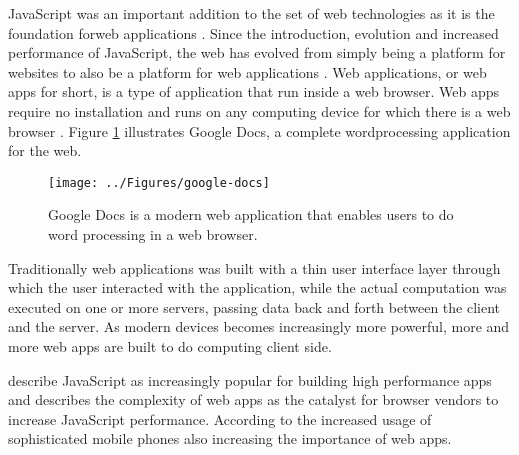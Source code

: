 JavaScript was an important addition to the set of web technologies as it is the foundation forweb applications \parencite{ParkJungMoon2015}. Since the introduction, evolution and increased performance of JavaScript, the web has evolved from simply being a platform for websites to also be a platform for web applications \parencite{SandhuHerreraHendren2018}. Web applications, or web apps for short, is a type of application that run inside a web browser. Web apps require no installation and runs on any computing device for which there is a web browser \parencite{RatanaworabhanLivshitsZorn2010}. Figure \ref{google-docs} illustrates Google Docs, a complete wordprocessing application for the web.

\begin{figure}[!h]
\centering
\texttt{[image: ../Figures/google-docs]}
\caption{Google Docs is a modern web application that enables users to do word processing in a web browser.}
\label{google-docs}
\end{figure}

Traditionally web applications was built with a thin user interface layer through which the user interacted with the application, while the actual computation was executed on one or more servers, %
passing data back and forth between the client and the server. As modern devices becomes increasingly more powerful, more and more web apps are built to do computing client side.

\textcite{SandhuHerreraHendren2018} describe JavaScript as increasingly popular for building high performance apps and \textcite{RatanaworabhanLivshitsZorn2010} describes the complexity of web apps as the catalyst for browser vendors to increase JavaScript performance. According to \textcite{RatanaworabhanLivshitsZorn2010} the increased usage of sophisticated mobile phones also increasing the importance of web apps.
